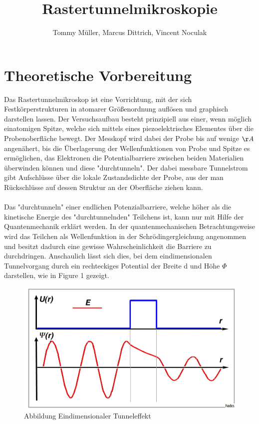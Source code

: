 \documentclass[10pt,a4paper]{article}
\author{Tommy Müller, Marcus Dittrich, Vincent Noculak}
\title{Rastertunnelmikroskopie}
\begin{document}
\maketitle
\newpage
\tableofcontents
\newpage

\section{ Theoretische Vorbereitung}

Das Rastertunnelmikroskop ist eine Vorrichtung, mit der sich Festkörperstrukturen in atomarer Größenordnung auflösen und graphisch darstellen lassen. Der Versuchsaufbau besteht prinzipiell aus einer, wenn möglich einatomigen Spitze, welche sich mittels eines piezoelektrisches Elementes über die Probenoberfläche bewegt. Der Messkopf wird dabei der Probe bis auf wenige $\AA$ angenähert, bis die Überlagerung der Wellenfunktionen von Probe und Spitze es ermöglichen, das Elektronen die Potentialbarriere zwischen beiden Materialien überwinden können und diese "durchtunneln". Der dabei messbare Tunnelstrom gibt Aufschlüsse über die lokale Zustandsdichte der Probe, aus der man Rückschlüsse auf dessen Struktur an der Oberfläche ziehen kann. \\ \\Das "durchtunneln" einer endlichen Potenzialbarriere, welche höher als die kinetische Energie des "durchtunnelnden" Teilchens ist, kann nur mit Hilfe der Quantenmechanik erklärt werden. In der quantenmechanischen Betrachtungsweise wird das Teilchen als Wellenfunktion in der Schrödingergleichung angenommen und besitzt dadurch eine gewisse Wahrscheinlichkeit die Barriere zu durchdringen. Anschaulich lässt sich dies, bei dem eindimensionalen Tunnelvorgang durch ein rechteckiges Potential der Breite d und Höhe $\Phi$ darstellen, wie in Figure 1 gezeigt.
\begin{figure}[h]
	\includegraphics[scale = 0.8]{tunnel.png}
	\centering
	\caption{Abbildung Eindimensionaler Tunneleffekt}
	\label{diagramm_aufspaltung}
\end{figure}
\end{document}
